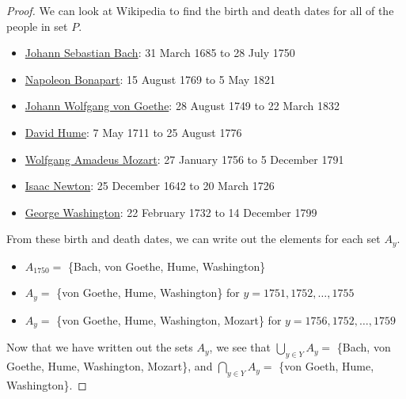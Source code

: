 \documentclass[12pt]{amsart}
\theoremstyle{definition}
\theoremstyle{remark}
\begin{document}
\begin{proof}
We can look at Wikipedia to find the birth and death dates for all of the people in set $P$.
\begin{itemize}
	\item \href{https://en.wikipedia.org/wiki/Johann_Sebastian_Bach}{Johann Sebastian Bach}:
	31 March 1685 to 28 July 1750
	
	\item \href{https://en.wikipedia.org/wiki/Napoleon}{Napoleon Bonapart}:
	15 August 1769 to 5 May 1821
	
	\item \href{https://en.wikipedia.org/wiki/Johann_Wolfgang_von_Goethe}
	{Johann Wolfgang von Goethe}: 28 August 1749 to 22 March 1832
	
	\item \href{https://en.wikipedia.org/wiki/David_Hume}{David Hume}:
	7 May 1711 to 25 August 1776
	
	\item \href{https://en.wikipedia.org/wiki/Wolfgang_Amadeus_Mozart}
	{Wolfgang Amadeus Mozart}: 27 January 1756 to 5 December 1791
	
	\item \href{https://en.wikipedia.org/wiki/Isaac_Newton}{Isaac Newton}:
	25 December 1642 to 20 March 1726
	
	\item \href{https://en.wikipedia.org/wiki/George_Washington}{George Washington}:
	22 February 1732 to 14 December 1799
\end{itemize}
From these birth and death dates, we can write out the elements for each set $A_y$.
\begin{itemize}
	\item $A_{1750} =$ \{Bach, von Goethe, Hume, Washington\}
	
	\item $A_{y} =$ \{von Goethe, Hume, Washington\} for $y = 1751, 1752, \dots, 1755$
	
	\item $A_{y} =$ \{von Goethe, Hume, Washington, Mozart\} for $y = 1756, 1752, \dots, 1759$
\end{itemize}
Now that we have written out the sets $A_y$, we see that
$\bigcup_{y \in Y} A_y =$ \{Bach, von Goethe, Hume, Washington, Mozart\}, and
$\bigcap_{y \in Y} A_y =$ \{von Goeth, Hume, Washington\}.
\end{proof}
\end{document}
